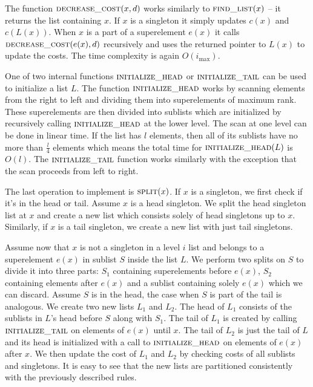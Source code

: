 The function $\textsc{decrease\_cost}(x, d)$ works similarly to $\textsc{find\_list}(x)$ – it returns the list containing $x$. If $x$ is a singleton it simply updates $c(x)$ and $c(L(x))$. When $x$ is a part of a superelement $e(x)$ it calls $\textsc{decrease\_cost}(e(x), d)$ recursively and uses the returned pointer to $L(x)$ to update the costs. The time complexity is again $O(i_{\max})$.

One of two internal functions $\textsc{initialize\_head}$ or $\textsc{initialize\_tail}$ can be used to initialize a list $L$. The function $\textsc{initialize\_head}$ works by scanning elements from the right to left and dividing them into superelements of maximum rank. These superelements are then divided into sublists which are initialized by recursively calling $\textsc{initialize\_head}$ at the lower level. The scan at one level can be done in linear time. If the list has $l$ elements, then all of its sublists have no more than $\frac{l}{4}$ elements which means the total time for $\textsc{initialize\_head}(L)$ is $O(l)$. The $\textsc{initialize\_tail}$ function works similarly with the exception that the scan proceeds from left to right.

The last operation to implement is $\textsc{split}(x)$. If $x$ is a singleton, we first check if it's in the head or tail. Assume $x$ is a head singleton. We split the head singleton list at $x$ and create a new list which consists solely of head singletons up to $x$. Similarly, if $x$ is a tail singleton, we create a new list with just tail singletons.

Assume now that $x$ is not a singleton in a level $i$ list and belongs to a superelement $e(x)$ in sublist $S$ inside the list $L$. We perform two splits on $S$ to divide it into three parts: $S_1$ containing superelements before $e(x)$, $S_2$ containing elements after $e(x)$ and a sublist containing solely $e(x)$ which we can discard. Assume $S$ is in the head, the case when $S$ is part of the tail is analogous. We create two new lists $L_1$ and $L_2$. The head of $L_1$ consists of the sublists in $L$'s head before $S$ along with $S_1$. The tail of $L_1$ is created by calling $\textsc{initialize\_tail}$ on elements of $e(x)$ until $x$. The tail of $L_2$ is just the tail of $L$ and its head is initialized with a call to $\textsc{initialize\_head}$ on elements of $e(x)$ after $x$. We then update the cost of $L_1$ and $L_2$ by checking costs of all sublists and singletons. It is easy to see that the new lists are partitioned consistently with the previously described rules.

